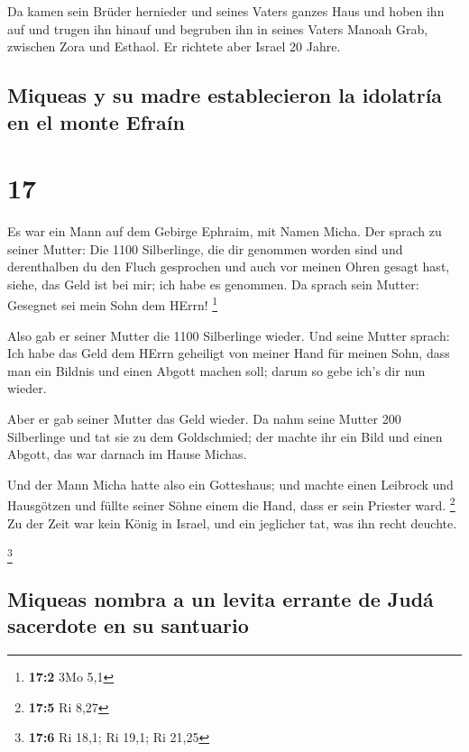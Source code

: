  Da kamen sein Brüder hernieder und seines Vaters ganzes
Haus und hoben ihn auf und trugen ihn hinauf und begruben ihn in seines
Vaters Manoah Grab, zwischen Zora und Esthaol. Er richtete aber Israel
20 Jahre.

\hypertarget{miqueas-y-su-madre-establecieron-la-idolatruxeda-en-el-monte-efrauxedn}{%
\subsection{Miqueas y su madre establecieron la idolatría en el monte
Efraín}\label{miqueas-y-su-madre-establecieron-la-idolatruxeda-en-el-monte-efrauxedn}}

\hypertarget{section-16}{%
\section{17}\label{section-16}}

 Es war ein Mann auf dem Gebirge Ephraim, mit Namen Micha.
 Der sprach zu seiner Mutter: Die 1100 Silberlinge, die
dir genommen worden sind und derenthalben du den Fluch gesprochen und
auch vor meinen Ohren gesagt hast, siehe, das Geld ist bei mir; ich habe
es genommen. Da sprach sein Mutter: Gesegnet sei mein Sohn dem HErrn!
\footnote{\textbf{17:2} 3Mo 5,1}

 Also gab er seiner Mutter die 1100 Silberlinge wieder.
Und seine Mutter sprach: Ich habe das Geld dem HErrn geheiligt von
meiner Hand für meinen Sohn, dass man ein Bildnis und einen Abgott
machen soll; darum so gebe ich's dir nun wieder.

 Aber er gab seiner Mutter das Geld wieder. Da nahm seine
Mutter 200 Silberlinge und tat sie zu dem Goldschmied; der machte ihr
ein Bild und einen Abgott, das war darnach im Hause Michas.

 Und der Mann Micha hatte also ein Gotteshaus; und machte
einen Leibrock und Hausgötzen und füllte seiner Söhne einem die Hand,
dass er sein Priester ward. \footnote{\textbf{17:5} Ri 8,27}
 Zu der Zeit war kein König in Israel, und ein jeglicher
tat, was ihn recht deuchte.

\footnote{\textbf{17:6} Ri 18,1; Ri 19,1; Ri 21,25}

\hypertarget{miqueas-nombra-a-un-levita-errante-de-juduxe1-sacerdote-en-su-santuario}{%
\subsection{Miqueas nombra a un levita errante de Judá sacerdote en su
santuario}\label{miqueas-nombra-a-un-levita-errante-de-juduxe1-sacerdote-en-su-santuario}}

